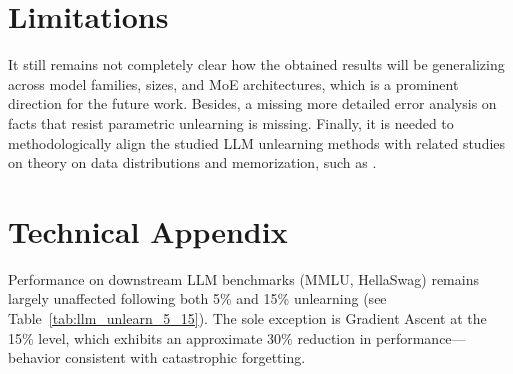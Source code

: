\documentclass[11pt]{article}
\begin{document}
{\section{Limitations}


It still remains not completely clear how the obtained results will be generalizing across model families, sizes, and MoE architectures, which is a prominent direction for the future work. Besides, a missing more detailed error  analysis on facts that resist parametric unlearning is missing. Finally, it is needed to methodologically align the studied LLM unlearning methods with related studies on theory on data distributions and memorization, such as \cite{yu2024generalizablity, sanderrethinking, mireshghallah2025position, fan2025opengu}.











\appendix

\section{Technical Appendix}
\label{sec:appendix}

Performance on downstream LLM benchmarks (MMLU, HellaSwag) remains largely unaffected following both 5\% and 15\% unlearning (see Table~\ref{tab:llm_unlearn_5_15}). The sole exception is Gradient Ascent at the 15\% level, which exhibits an approximate 30\% reduction in performance—behavior consistent with catastrophic forgetting.


}
\end{document}

